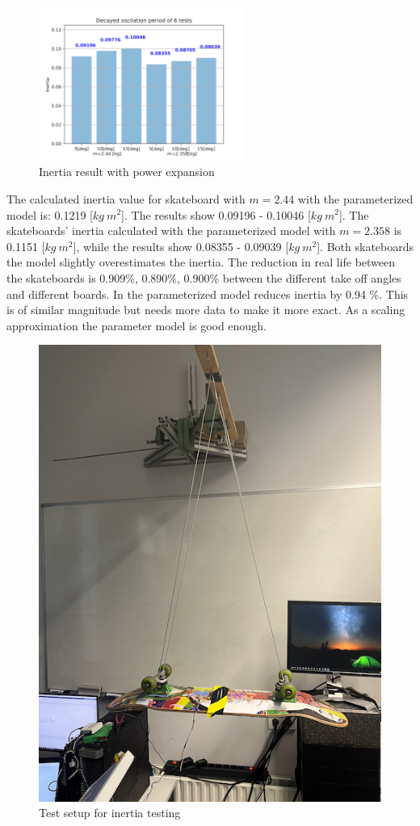 \begin{figure}
    \centering
    \includegraphics[width = 0.6\textwidth]{figure/Inertia_result_powerexpansiondpi600.png}
    \caption{Inertia result with power expansion}
    \label{f_powerexp}
\end{figure}

The calculated inertia value for skateboard with $m=2.44$ with the parameterized model is: 0.1219 [$kg\ m^2$]. The results show 0.09196 - 0.10046 [$kg\ m^2$]. The skateboards' inertia calculated with the parameterized model  with $m= 2.358$ is 0.1151 [$kg\ m^2$], while the results show 0.08355 - 0.09039 [$kg\ m^2$]. Both skateboards the model slightly overestimates the inertia.   The reduction in real life between the skateboards is 0.909\%, 0.890\%, 0.900\% between the different take off angles and different boards. In the parameterized model reduces inertia by 0.94 \%. This is of similar magnitude but needs more data to make it more exact. As a scaling approximation the parameter model is good enough.

\begin{figure}
    \centering
    \includegraphics[width = 0.4 \textwidth]{figure/Testsetup.png}
    \caption{Test setup for inertia testing}
    \label{f_testsetup}
\end{figure}

